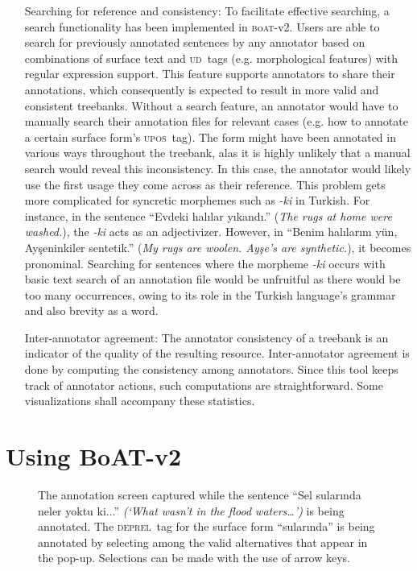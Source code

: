 \documentclass{elektr}
\newcommand{\boatvtwo}{\textsc{b}o\textsc{at}-{\scriptsize v2}}
\newcommand{\upos}{\textsc{upos}}
\newcommand{\deprel}{\textsc{deprel}}
\newcommand{\ud}{\textsc{ud}}
\begin{document}
\begin{itemize}[before=\normalfont, font=\itshape, align=left,noitemsep,topsep=0pt,parsep=3pt,partopsep=0pt,labelsep=3pt,align=left]
    \item[Searching for reference and consistency:]
        To facilitate effective searching, a search functionality has been implemented in \boatvtwo.
        Users are able to search for previously annotated sentences by any annotator based on combinations of surface text and \ud\ tags (e.g. morphological features) with regular expression support.
        This feature supports annotators to share their annotations, which consequently is expected to result in more valid and consistent treebanks.
		Without a search feature, an annotator would have to manually search their annotation files for relevant cases (e.g. how to annotate a certain surface form's \upos\ tag).
		The form might have been annotated in various ways throughout the treebank, alas it is highly unlikely that a manual search would reveal this inconsistency.
		In this case, the annotator would likely use the first usage they come across as their reference.
        This problem gets more complicated for syncretic morphemes such as \textit{-ki} in Turkish.
        For instance, in the sentence ``Evdeki halılar yıkandı.'' (\textit{The rugs at home were washed.}), the \textit{-ki} acts as an adjectivizer.
        However, in ``Benim halılarım yün, Ayşeninkiler sentetik.'' (\textit{My rugs are woolen. Ayşe's are synthetic.}), it becomes pronominal.
        Searching for sentences where the morpheme \textit{-ki} occurs with basic text search of an annotation file would be unfruitful as there would be too many occurrences, owing to its role in the Turkish language's grammar and also brevity as a word.

    \item[Inter-annotator agreement:]
        The annotator consistency of a treebank is an indicator of the quality of the resulting resource.
        Inter-annotator agreement is done by computing the consistency among annotators.
        Since this tool keeps track of annotator actions, such computations are straightforward.
        Some visualizations shall accompany these statistics.

\end{itemize}

% 
\section{Using BoAT-v2}
\label{sec:annotation}

\begin{figure}
    \centering
    \caption{The annotation screen captured while the sentence ``Sel sularında neler yoktu ki...'' \textit{(‘What wasn't in the flood waters…’)} is being annotated. The \deprel\ tag for the surface form ``sularında'' is being annotated by selecting among the valid alternatives that appear in the pop-up. Selections can be made with the use of arrow keys.}
    \label{fig:anno-fig}
\end{figure}
\end{document}
